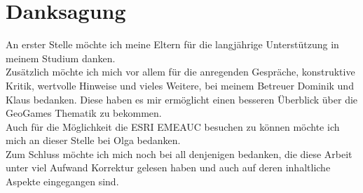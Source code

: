 \chapter*{Danksagung}
\label{ch0:Dank}

An erster Stelle möchte ich meine Eltern für die langjährige Unterstützung in meinem Studium danken.\\
Zusätzlich möchte ich mich vor allem für die anregenden Gespräche, konstruktive Kritik, wertvolle Hinweise und vieles Weitere, bei meinem Betreuer Dominik und Klaus bedanken.
Diese haben es mir ermöglicht einen besseren Überblick über die GeoGames Thematik zu bekommen.\\
Auch für die Möglichkeit die ESRI EMEAUC besuchen zu können möchte ich mich an dieser Stelle bei Olga bedanken.\\
Zum Schluss möchte ich mich noch bei all denjenigen bedanken, die diese Arbeit unter viel Aufwand Korrektur gelesen haben und auch auf deren inhaltliche Aspekte eingegangen sind.\\

